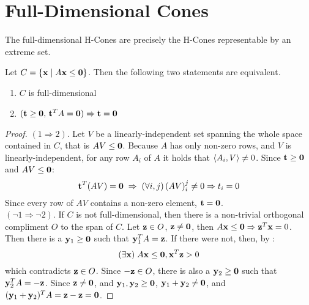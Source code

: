 \section{Full-Dimensional Cones}

\begin{Prop}\label{extreme_hcones}
	The full-dimensional H-Cones are precisely the H-Cones representable by an extreme set.
\end{Prop}

\begin{Lemma}\label{full_independence}
	Let $C = \left\{\mathbf{x}\;|\; A\mathbf{x}\leq\mathbf{0}\right\}$.  Then the following two statements are equivalent.
	\begin{enumerate}
		\item $C$ is full-dimensional
		\item $(\mathbf{t}\geq\mathbf{0},\,\mathbf{t}^T A=\mathbf{0})\Rightarrow \mathbf{t}=\mathbf{0}$
	\end{enumerate}
\end{Lemma}

\begin{proof}
  $(1\Rightarrow 2)$.  Let $V$ be a linearly-independent set spanning the whole space contained in $C$, that is $AV\leq\mathbf{0}$.  Because $A$ has only non-zero rows, and $V$ is linearly-independent, for any row $A_i$ of $A$ it holds that $\left\langle A_i, V \right\rangle \neq 0$.  Since $\mathbf{t}\geq\mathbf{0}$ and $AV\leq\mathbf{0}$:
  \[ \mathbf{t}^T(AV) = \mathbf{0} \;\Rightarrow\; (\forall i,j)\,(AV)_i^j \neq 0 \Rightarrow t_i = 0\]
  Since every row of $AV$ contains a non-zero element, $\mathbf{t}=\mathbf{0}$.\\
  $(\neg 1\Rightarrow\neg 2)$.  If $C$ is not full-dimensional, then there is a non-trivial orthogonal compliment $O$ to the span of $C$.  Let $\mathbf{z}\in O$, $\mathbf{z}\neq\mathbf{0}$, then $A\mathbf{x}\leq\mathbf{0} \Rightarrow \mathbf{z}^T\mathbf{x} = 0$.  Then there is a $\mathbf{y}_1\geq\mathbf{0}$ such that $\mathbf{y}_1^T A = \mathbf{z}$.  If there were not, then, by :
  \[ (\exists \mathbf{x})\;A\mathbf{x}\leq\mathbf{0}, \mathbf{x}^T\mathbf{z} > 0 \]
  which contradicts $\mathbf{z}\in O$.  Since $-\mathbf{z}\in O$, there is also a $\mathbf{y}_2\geq\mathbf{0}$ such that $\mathbf{y}_2^T A = -\mathbf{z}$.  Since $\mathbf{z}\neq\mathbf{0}$, and $\mathbf{y}_1,\mathbf{y}_2\geq\mathbf{0}$, $\mathbf{y}_1+\mathbf{y}_2\neq\mathbf{0}$, and $(\mathbf{y}_1+\mathbf{y}_2)^T A = \mathbf{z}-\mathbf{z} = \mathbf{0}$.
\end{proof}

